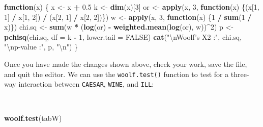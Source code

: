 \documentclass[12pt,a4paper]{book}
\newenvironment{Shaded}{\begin{snugshade}}{\end{snugshade}}
\newcommand{\KeywordTok}[1]{\textcolor[rgb]{0.13,0.29,0.53}{\textbf{#1}}}
\newcommand{\DataTypeTok}[1]{\textcolor[rgb]{0.13,0.29,0.53}{#1}}
\newcommand{\DecValTok}[1]{\textcolor[rgb]{0.00,0.00,0.81}{#1}}
\newcommand{\FloatTok}[1]{\textcolor[rgb]{0.00,0.00,0.81}{#1}}
\newcommand{\CharTok}[1]{\textcolor[rgb]{0.31,0.60,0.02}{#1}}
\newcommand{\StringTok}[1]{\textcolor[rgb]{0.31,0.60,0.02}{#1}}
\newcommand{\OtherTok}[1]{\textcolor[rgb]{0.56,0.35,0.01}{#1}}
\newcommand{\ControlFlowTok}[1]{\textcolor[rgb]{0.13,0.29,0.53}{\textbf{#1}}}
\newcommand{\OperatorTok}[1]{\textcolor[rgb]{0.81,0.36,0.00}{\textbf{#1}}}
\newcommand{\NormalTok}[1]{#1}
\theoremstyle{definition}
\theoremstyle{definition}
\theoremstyle{definition}
\theoremstyle{remark}
\begin{document}
\begin{Shaded}
\begin{Highlighting}[]
\ControlFlowTok{function}\NormalTok{(x) \{}
\NormalTok{  x <-}\StringTok{ }\NormalTok{x }\OperatorTok{+}\StringTok{ }\FloatTok{0.5}
\NormalTok{  k <-}\StringTok{ }\KeywordTok{dim}\NormalTok{(x)[}\DecValTok{3}\NormalTok{]}
\NormalTok{  or <-}\StringTok{ }\KeywordTok{apply}\NormalTok{(x, }\DecValTok{3}\NormalTok{, }\ControlFlowTok{function}\NormalTok{(x)}
\NormalTok{              \{(x[}\DecValTok{1}\NormalTok{, }\DecValTok{1}\NormalTok{] }\OperatorTok{/}\StringTok{ }\NormalTok{x[}\DecValTok{1}\NormalTok{, }\DecValTok{2}\NormalTok{]) }\OperatorTok{/}\StringTok{ }\NormalTok{(x[}\DecValTok{2}\NormalTok{, }\DecValTok{1}\NormalTok{] }\OperatorTok{/}\StringTok{ }\NormalTok{x[}\DecValTok{2}\NormalTok{, }\DecValTok{2}\NormalTok{])\})}
\NormalTok{  w <-}\StringTok{ }\KeywordTok{apply}\NormalTok{(x, }\DecValTok{3}\NormalTok{, }\ControlFlowTok{function}\NormalTok{(x) \{}\DecValTok{1} \OperatorTok{/}\StringTok{ }\KeywordTok{sum}\NormalTok{(}\DecValTok{1} \OperatorTok{/}\StringTok{ }\NormalTok{x)\})}
\NormalTok{  chi.sq <-}\StringTok{ }\KeywordTok{sum}\NormalTok{(w }\OperatorTok{*}\StringTok{ }\NormalTok{(}\KeywordTok{log}\NormalTok{(or) }\OperatorTok{-}\StringTok{ }\KeywordTok{weighted.mean}\NormalTok{(}\KeywordTok{log}\NormalTok{(or), w))}\OperatorTok{^}\DecValTok{2}\NormalTok{)}
\NormalTok{  p <-}\StringTok{ }\KeywordTok{pchisq}\NormalTok{(chi.sq, }\DataTypeTok{df =}\NormalTok{ k }\OperatorTok{-}\StringTok{ }\DecValTok{1}\NormalTok{, }\DataTypeTok{lower.tail =} \OtherTok{FALSE}\NormalTok{)}
  \KeywordTok{cat}\NormalTok{(}\StringTok{"}\CharTok{\textbackslash{}n}\StringTok{Woolf's X2 :"}\NormalTok{, chi.sq,}
      \StringTok{"}\CharTok{\textbackslash{}n}\StringTok{p-value    :"}\NormalTok{, p, }\StringTok{"}\CharTok{\textbackslash{}n}\StringTok{"}\NormalTok{)}
\NormalTok{\}}
\end{Highlighting}
\end{Shaded}

\newpage

Once you have made the changes shown above, check your work, save the
file, and quit the editor. We can use the \texttt{woolf.test()} function
to test for a three-way interaction between \texttt{CAESAR},
\texttt{WINE}, and \texttt{ILL}:

~

\begin{Shaded}
\begin{Highlighting}[]
\KeywordTok{woolf.test}\NormalTok{(tabW)}
\end{Highlighting}
\end{Shaded}
\end{document}

